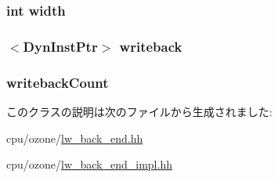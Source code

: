 \label{classLWBackEnd_a20d3086e6bcdc826d99143ac7c9b23a4}
\hypertarget{classLWBackEnd_a2474a5474cbff19523a51eb1de01cda4}{
\subsubsection[{width}]{\setlength{\rightskip}{0pt plus 5cm}int {\bf width}}}
\label{classLWBackEnd_a2474a5474cbff19523a51eb1de01cda4}
\hypertarget{classLWBackEnd_ae4b76f4612be07d13b349e13ee9dfa16}{
\subsubsection[{writeback}]{$<${\bf DynInstPtr}$>$ {\bf writeback}}}
\label{classLWBackEnd_ae4b76f4612be07d13b349e13ee9dfa16}
\hypertarget{classLWBackEnd_a85f5041a2e3375a2dc81bc0ae534aa2e}{
\subsubsection[{writebackCount}]{ {\bf writebackCount}}}
\label{classLWBackEnd_a85f5041a2e3375a2dc81bc0ae534aa2e}


このクラスの説明は次のファイルから生成されました:\begin{DoxyCompactItemize}
\item 
cpu/ozone/\hyperlink{lw__back__end_8hh}{lw\_\-back\_\-end.hh}\item 
cpu/ozone/\hyperlink{lw__back__end__impl_8hh}{lw\_\-back\_\-end\_\-impl.hh}\end{DoxyCompactItemize}
